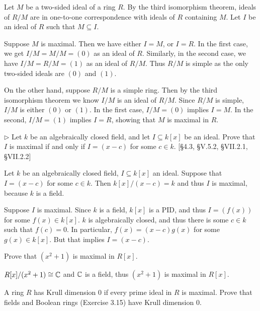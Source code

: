 \begin{solution}
	Let $M$ be a two-sided ideal of a ring $R$. By the third isomorphism theorem, ideals of $R/M$ are in one-to-one correspondence with ideals of $R$ containing $M$. Let $I$ be an ideal of $R$ such that $M \subseteq I$.
	
	Suppose $M$ is maximal. Then we have either $I = M$, or $I = R$. In the first case, we get $I/M = M/M = (0)$ as an ideal of $R$. Similarly, in the second case, we have $I/M = R/M = (1)$ as an ideal of $R/M$. Thus $R/M$ is simple as the only two-sided ideals are $(0)$ and $(1)$.
	
	On the other hand, suppose $R/M$ is a simple ring. Then by the third isomorphism theorem we know $I/M$ is an ideal of $R/M$. Since $R/M$ is simple, $I/M$ is either $(0)$ or $(1)$. In the first case, $I/M = (0)$ implies $I = M$. In the second, $I/M = (1)$ implies $I = R$, showing that $M$ is maximal in $R$.
\end{solution}

\begin{problem}
	$\triangleright$ Let $k$ be an algebraically closed field, and let $I \subseteq k[x]$ be an ideal. Prove that $I$ is maximal if and only if $I = (x - c)$ for some $c \in k$. [\S 4.3, \S V.5.2, \S VII.2.1, \S VII.2.2]
\end{problem}

\begin{solution}
	Let $k$ be an algebraically closed field, $I \subseteq k[x]$ an ideal. Suppose that $I = (x - c)$ for some $c \in k$. Then $k[x]/(x-c) = k$ and thus $I$ is maximal, because $k$ is a field.
	
	Suppose $I$ is maximal. Since $k$ is a field, $k[x]$ is a PID, and thus $I = (f(x))$ for some $f(x) \in k[x]$. $k$ is algebraically closed, and thus there is some $c \in k$ such that $f(c) = 0$. In particular, $f(x) = (x-c)g(x)$ for some $g(x) \in k[x]$. But that implies $I = (x-c)$.
\end{solution}

\begin{problem}
	Prove that $(x^2 + 1)$ is maximal in $R[x]$.
\end{problem}

\begin{solution}
	$R[x]/(x^2 + 1) \cong \mathbb{C}$ and $\mathbb{C}$ is a field, thus $(x^2 + 1)$ is maximal in $R[x]$.
\end{solution}

\begin{problem}
	A ring $R$ has Krull dimension $0$ if every prime ideal in $R$ is maximal. Prove that fields and Boolean rings (Exercise 3.15) have Krull dimension $0$.
\end{problem}

